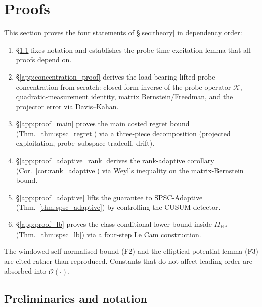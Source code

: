 \documentclass{article}
\newcommand{\tilO}{\widetilde{\mathcal{O}}}
\begin{document}
\section{Proofs}
\label{app:proofs}

This section proves the four statements of \S\ref{sec:theory} in
dependency order:
\begin{enumerate}[leftmargin=*,itemsep=1pt,topsep=2pt]
  \item \S\ref{app:prelim} fixes notation and establishes the
    probe-time excitation lemma that all proofs depend on.
  \item \S\ref{app:concentration_proof} derives the load-bearing
    lifted-probe concentration from scratch: closed-form inverse of the
    probe operator $\mathcal K$, quadratic-measurement identity, matrix
    Bernstein/Freedman, and the projector error via Davis--Kahan.
  \item \S\ref{app:proof_main} proves the main costed regret bound
    (Thm.~\ref{thm:spsc_regret}) via a three-piece decomposition
    (projected exploitation, probe--subspace tradeoff, drift).
  \item \S\ref{app:proof_adaptive_rank} derives the rank-adaptive
    corollary (Cor.~\ref{cor:rank_adaptive}) via Weyl's inequality on
    the matrix-Bernstein bound.
  \item \S\ref{app:proof_adaptive} lifts the guarantee to
    SPSC-Adaptive (Thm.~\ref{thm:spsc_adaptive}) by controlling the
    CUSUM detector.
  \item \S\ref{app:proof_lb} proves the class-conditional lower bound
    inside $\Pi_{\mathrm{HP}}$ (Thm.~\ref{thm:spsc_lb}) via a four-step
    Le Cam construction.
\end{enumerate}
The windowed self-normalised bound (F2) and the elliptical potential
lemma (F3) are cited rather than reproduced. Constants that do not
affect leading order are absorbed into $\tilO(\cdot)$.

\subsection{Preliminaries and notation}
\label{app:prelim}
\end{document}
